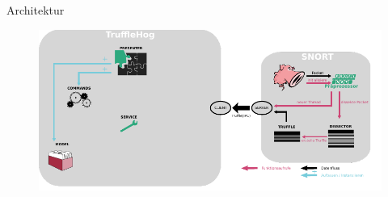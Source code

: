\begin{frame}{Architektur}
    \begin{figure}
    	\centering
    	\includegraphics[width=\textwidth]{./images/arch/11.pdf}
    \end{figure}
\end{frame}
